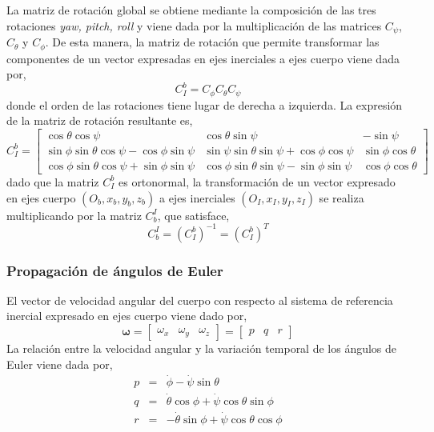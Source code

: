 \documentclass[a4paper,12pt]{book}
\begin{document}
La matriz de rotación global se obtiene mediante la composición de las tres rotaciones \emph{yaw, pitch, roll} y viene dada por la multiplicación de las matrices $C_\psi$, $C_\theta$ y $C_\phi$. De esta manera, la matriz de rotación que permite transformar las componentes de un vector expresadas en ejes inerciales a ejes cuerpo viene dada por,
\begin{equation}
    C_I^b = C_\phi C_\theta C_\psi
\end{equation}
donde el orden de las rotaciones tiene lugar de derecha a izquierda. La expresión de la matriz de rotación resultante es,
\begin{equation}
         C_I^b= \begin{bmatrix}  \cos\theta\cos\psi & \cos\theta\sin\psi & -\sin\psi \\ \sin\phi\sin\theta\cos\psi - \cos\phi\sin\psi & \sin\psi\sin\theta\sin\psi + \cos\phi\cos\psi & \sin\phi\cos\theta \\ \cos\phi\sin\theta\cos\psi + \sin\phi\sin\psi & \cos\phi\sin\theta\sin\psi - \sin\phi\sin\psi & \cos\phi\cos\theta \end{bmatrix}
    \end{equation}
dado que la matriz $C_I^b$ es ortonormal, la transformación de un vector expresado en ejes cuerpo $(O_b,x_b,y_b,z_b)$ a ejes inerciales $(O_I,x_I,y_I,z_I)$ se realiza multiplicando por la matriz $C_b^I$, que satisface,
\begin{equation}
     C_b^I = (C_I^b)^{-1} = (C_I^b)^T
\end{equation}

\subsubsection{Propagación de ángulos de Euler}

El vector de velocidad angular del cuerpo con respecto al sistema de referencia inercial expresado en ejes cuerpo viene dado por,
\begin{equation}
    \mathbf{\omega} = \begin{bmatrix} \omega_x & \omega_y & \omega_z   \end{bmatrix} = \begin{bmatrix} p & q & r   \end{bmatrix}
\end{equation}
La relación entre la velocidad angular y la variación temporal de los ángulos de Euler viene dada por,
\begin{eqnarray}
    p & = &    \dot{\phi} - \dot{\psi}\sin\theta\\
    q & = & \dot{\theta}\cos\phi + \dot{\psi}\cos\theta\sin\phi\\
    r & = & -\dot{\theta}\sin\phi + \dot{\psi}\cos\theta\cos\phi
\end{eqnarray}
\end{document}
